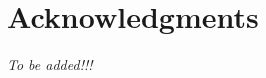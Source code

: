 


\bigskip

\begingroup
\let\clearpage\relax
\let\cleardoublepage\relax
\let\cleardoublepage\relax
\chapter*{Acknowledgments}

\emph{To be added!!!} 


\endgroup



